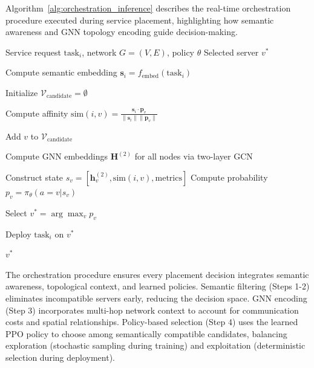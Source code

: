 Algorithm~\ref{alg:orchestration_inference} describes the real-time orchestration procedure executed during service placement, highlighting how semantic awareness and GNN topology encoding guide decision-making.

\begin{algorithm}[t]
\caption{FedSemGNN Orchestration (Inference)}
\label{alg:orchestration_inference}
\begin{algorithmic}[1]
\REQUIRE Service request $\text{task}_i$, network $G=(V,E)$, policy $\theta$
\ENSURE Selected server $v^*$

\STATE Compute semantic embedding $\mathbf{s}_i = f_{\text{embed}}(\text{task}_i)$

\STATE Initialize $\mathcal{V}_{\text{candidate}} = \emptyset$

\STATE Compute affinity $\text{sim}(i,v) = \frac{\mathbf{s}_i \cdot \mathbf{p}_v}{\|\mathbf{s}_i\| \|\mathbf{p}_v\|}$

\STATE Add $v$ to $\mathcal{V}_{\text{candidate}}$
\ENDIF
\ENDFOR

\STATE

\STATE Compute GNN embeddings $\mathbf{H}^{(2)}$ for all nodes via two-layer GCN

\STATE Construct state $s_v = [\mathbf{h}_v^{(2)}, \text{sim}(i,v), \text{metrics}]$
\STATE Compute probability $p_v = \pi_\theta(a=v | s_v)$
\ENDFOR

\STATE

\STATE Select $v^* = \arg\max_v p_v$

\STATE Deploy $\text{task}_i$ on $v^*$

\RETURN $v^*$
\end{algorithmic}
\end{algorithm}

The orchestration procedure ensures every placement decision integrates semantic awareness, topological context, and learned policies. Semantic filtering (Steps 1-2) eliminates incompatible servers early, reducing the decision space. GNN encoding (Step 3) incorporates multi-hop network context to account for communication costs and spatial relationships. Policy-based selection (Step 4) uses the learned PPO policy to choose among semantically compatible candidates, balancing exploration (stochastic sampling during training) and exploitation (deterministic selection during deployment).

